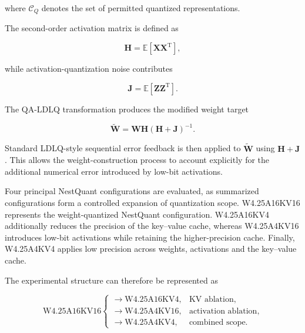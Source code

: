 where \(\mathcal{C}_{Q}\) denotes the set of permitted quantized
representations.

The second-order activation matrix is defined as

\begin{equation}
\mathbf{H}
=
\mathbb{E}
\left[
\mathbf{X}\mathbf{X}^{\mathrm{T}}
\right],
\label{eq:nestquant-hessian}
\end{equation}

while activation-quantization noise contributes

\begin{equation}
\mathbf{J}
=
\mathbb{E}
\left[
\mathbf{Z}\mathbf{Z}^{\mathrm{T}}
\right].
\label{eq:nestquant-noise}
\end{equation}

The QA-LDLQ transformation produces the modified weight target

\begin{equation}
\widetilde{\mathbf{W}}
=
\mathbf{W}\mathbf{H}
\left(
\mathbf{H}+\mathbf{J}
\right)^{-1}.
\label{eq:qa-ldlq-target}
\end{equation}

Standard LDLQ-style sequential error feedback is then applied to
\(\widetilde{\mathbf{W}}\) using
\(\mathbf{H}+\mathbf{J}\). This allows the weight-construction process
to account explicitly for the additional numerical error introduced by
low-bit activations.

Four principal NestQuant configurations are evaluated, as summarized configurations form a controlled expansion of quantization scope.
W4.25A16KV16 represents the weight-quantized NestQuant configuration.
W4.25A16KV4 additionally reduces the precision of the key--value cache,
whereas W4.25A4KV16 introduces low-bit activations while retaining the
higher-precision cache. Finally, W4.25A4KV4 applies low precision across
weights, activations and the key--value cache.

The experimental structure can therefore be represented as

\begin{equation}
\mathrm{W4.25A16KV16}
\begin{cases}
\longrightarrow \mathrm{W4.25A16KV4}, & \text{KV ablation},\\[2mm]
\longrightarrow \mathrm{W4.25A4KV16}, & \text{activation ablation},\\[2mm]
\longrightarrow \mathrm{W4.25A4KV4},  & \text{combined scope}.
\end{cases}
\label{eq:nestquant-scope-tree}
\end{equation}

